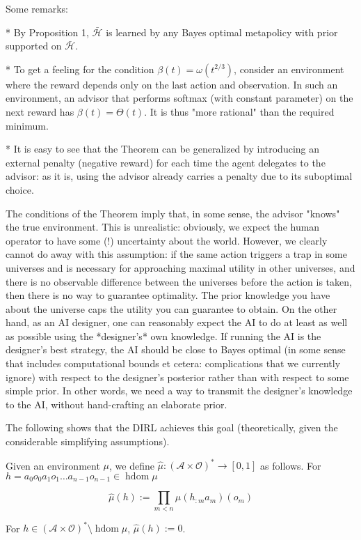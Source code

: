 \documentclass[a4paper]{article}
\newcommand{\Ob}{\mathcal{O}}
\newcommand{\A}{\mathcal{A}}
\newcommand{\FH}{(\A \times \Ob)^*}
\DeclareMathOperator{\HD}{hdom}
\newcommand{\Hy}{\mathcal{H}}
\begin{document}
Some remarks:

* By Proposition 1, $\bar{\Hy}$ is learned by any Bayes optimal metapolicy with prior supported on $\bar{\Hy}$.

* To get a feeling for the condition $\beta(t)=\omega(t^{2/3})$, consider an environment where the reward depends only on the last action and observation. In such an environment, an advisor that performs softmax (with constant parameter) on the next reward has $\beta(t) = \Theta(t)$. It is thus "more rational" than the required minimum.

* It is easy to see that the Theorem can be generalized by introducing an external penalty (negative reward) for each time the agent delegates to the advisor: as it is, using the advisor already carries a penalty due to its suboptimal choice.

The conditions of the Theorem imply that, in some sense, the advisor "knows" the true environment. This is unrealistic: obviously, we expect the human operator to have some (!) uncertainty about the world. However, we clearly cannot do away with this assumption: if the same action triggers a trap in some universes and is necessary for approaching maximal utility in other universes, and there is no observable difference between the universes before the action is taken, then there is no way to guarantee optimality. The prior knowledge you have about the universe caps the utility you can guarantee to obtain. On the other hand, as an AI designer, one can reasonably expect the AI to do at least as well as possible using the *designer's* own knowledge. If running the AI is the designer's best strategy, the AI should be close to Bayes optimal (in some sense that includes computational bounds et cetera: complications that we currently ignore) with respect to the designer's posterior rather than with respect to some simple prior. In other words, we need a way to transmit the designer's knowledge to the AI, without hand-crafting an elaborate prior.

The following shows that the DIRL achieves this goal (theoretically, given the considerable simplifying assumptions). 

Given an environment $\mu$, we define $\hat{\mu}: \FH \rightarrow [0,1]$ as follows. For $h = a_0 o_0 a_1 o_1 \ldots a_{n-1} o_{n-1} \in \HD{\mu}$

$$\hat{\mu}(h):=\prod_{m < n} \mu(h_{:m}a_m)(o_m)$$

For $h \in \FH \setminus \HD{\mu}$, $\hat{\mu}(h):=0$.
\end{document}
